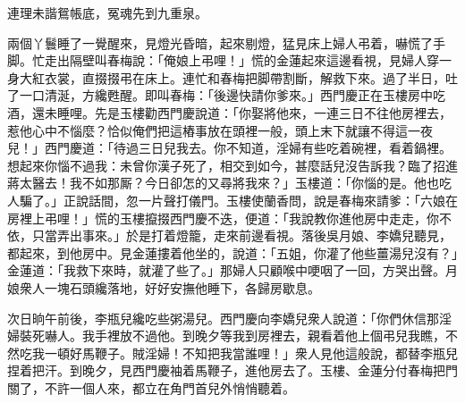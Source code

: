 \begin{myquote} 
連理未諧鴛帳底，冤魂先到九重泉。
\end{myquote} 

兩個丫鬟睡了一覺醒來，見燈光昏暗，起來剔燈，猛見床上婦人弔着，嚇慌了手脚。忙走出隔壁叫春梅說：「俺娘上弔哩！」慌的金蓮起來這邊看視，見婦人穿一身大紅衣裳，直掇掇弔在床上。連忙和春梅把脚帶割斷，解救下來。過了半日，吐了一口清涎，方纔甦醒。即叫春梅：「後邊快請你爹來。」西門慶正在玉樓房中吃酒，還未睡哩。先是玉樓勸西門慶說道：「你娶將他來，一連三日不往他房裡去，惹他心中不惱麼？恰似俺們把這樁事放在頭裡一般，頭上末下就讓不得這一夜兒！」西門慶道：「待過三日兒我去。你不知道，淫婦有些吃着碗裡，看着鍋裡。想起來你惱不過我：未曾你漢子死了，相交到如今，甚麼話兒沒告訴我？臨了招進蔣太醫去！我不如那厮？今日卻怎的又尋將我來？」玉樓道：「你惱的是。他也吃人騙了。」正說話間，忽一片聲打儀門。玉樓使蘭香問，說是春梅來請爹：「六娘在房裡上弔哩！」慌的玉樓攛掇西門慶不迭，便道：「我說教你進他房中走走，你不依，只當弄出事來。」於是打着燈籠，走來前邊看視。落後吳月娘、李嬌兒聽見，都起來，到他房中。見金蓮摟着他坐的，說道：「五姐，你灌了他些薑湯兒沒有？」金蓮道：「我救下來時，就灌了些了。」那婦人只顧喉中哽咽了一回，方哭出聲。月娘衆人一塊石頭纔落地，好好安撫他睡下，各歸房歇息。

次日晌午前後，李瓶兒纔吃些粥湯兒。西門慶向李嬌兒衆人說道：「你們休信那淫婦裝死嚇人。我手裡放不過他。到晚夕等我到房裡去，親看着他上個弔兒我瞧，不然吃我一頓好馬鞭子。賊淫婦！不知把我當誰哩！」衆人見他這般說，都替李瓶兒捏着把汗。到晚夕，見西門慶袖着馬鞭子，進他房去了。玉樓、金蓮分付春梅把門關了，不許一個人來，都立在角門首兒外悄悄聽着。

